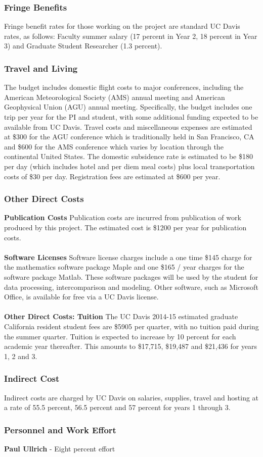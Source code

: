 \documentclass[11pt]{article}
\begin{document}
\subsubsection{Fringe Benefits}
Fringe benefit rates for those working on the project are standard UC Davis rates, as follows: Faculty summer salary (17 percent in Year 2, 18 percent in Year 3) and Graduate Student Researcher (1.3 percent).

\subsubsection{Travel and Living}
The budget includes domestic flight costs to major conferences, including the American Meteorological Society (AMS) annual meeting and American Geophysical Union (AGU) annual meeting. Specifically, the budget includes one trip per year for the PI and student, with some additional funding expected to be available from UC Davis. Travel costs and miscellaneous expenses are estimated at \$300 for the AGU conference which is traditionally held in San Francisco, CA and \$600 for the AMS conference which varies by location through the continental United States. The domestic subsidence rate is estimated to be \$180 per day (which includes hotel and per diem meal costs) plus local transportation costs of \$30 per day. Registration fees are estimated at \$600 per year.

\subsubsection{Other Direct Costs}
\textbf{Publication Costs}
Publication costs are incurred from publication of work produced by this project. The estimated cost is \$1200 per year for publication costs.
\\\\
\textbf{Software  Licenses}
Software license charges include a one time \$145 charge for the mathematics software package Maple and one \$165 / year charges for the software package Matlab. These software packages will be used by the student for data processing, intercomparison and modeling. Other software, such as Microsoft Office, is available for free via a UC Davis license.
\\\\
\textbf{Other Direct Costs:  Tuition}
The UC Davis 2014-15 estimated graduate California resident student fees are \$5905 per quarter, with no tuition paid during the summer quarter. Tuition is expected to increase by 10 percent for each academic year thereafter. This amounts to \$17,715, \$19,487 and \$21,436 for years 1, 2 and 3.

\subsubsection{Indirect Cost}
Indirect costs are charged by UC Davis on salaries, supplies, travel and hosting at a rate of 55.5 percent, 56.5 percent and 57 percent for years 1 through 3.

\subsubsection{Personnel and Work Effort}
\textbf{Paul Ullrich} - Eight percent effort
\end{document}
